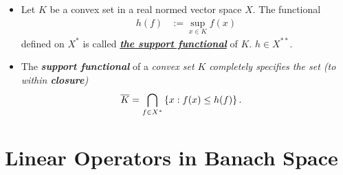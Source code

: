 \documentclass[11pt]{article}
\begin{document}
\begin{itemize}
\item \begin{definition}
Let $K$ be a convex set in a real normed vector space $X$. The functional
\begin{align*}
h(f) &:= \sup_{x \in K}f(x)
\end{align*} defined on $X^{*}$ is called \underline{\emph{\textbf{the support functional}}} of $K$. $h \in X^{**}$.
\end{definition}

\item \begin{remark}
The \emph{\textbf{support functional}} of a \emph{convex set $K$} \emph{completely specifies the set (to within \textbf{closure})}
\begin{align*}
\overline{K} &= \bigcap_{f \in X^{*}}\left\{x: f(x) \le h(f)\right\}.
\end{align*}
\end{remark}

\end{itemize}

\section{Linear Operators in Banach Space}
\end{document}
